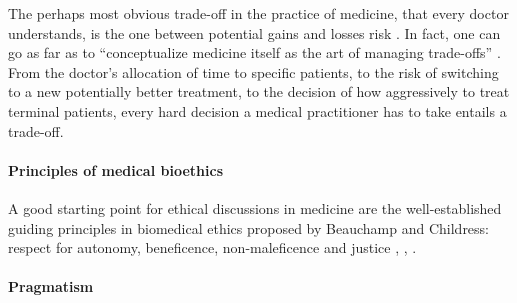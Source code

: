     The perhaps most obvious trade-off in the practice of medicine, that every doctor understands, is the one between potential gains and losses risk \cite{Launer2020}.
    In fact, one can go as far as to ``conceptualize medicine itself as the art of managing trade-offs'' \cite{Launer2020}.
    From the doctor's allocation of time to specific patients, to the risk of switching to a new potentially better treatment, to the decision of how aggressively to treat terminal patients, every hard decision a medical practitioner has to take entails a trade-off.

    \paragraph{Principles of medical bioethics}
    A good starting point for ethical discussions in medicine are the well-established guiding principles in biomedical ethics proposed by Beauchamp and Childress: respect for autonomy, beneficence, non-maleficence and justice \cite[pp.~344-345]{Dijkstra2020}, \cite[p.~2]{Morley2020}, \cite[p.~2]{Rajkomar2018}.


    \paragraph{Pragmatism}

